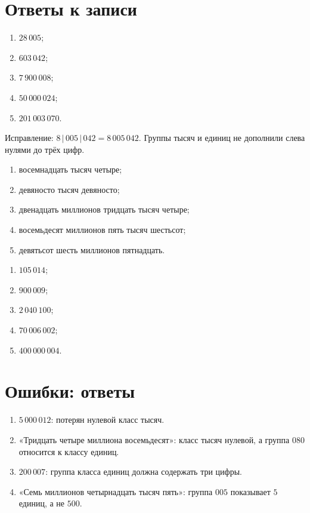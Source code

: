 \newpage
\section{Ответы к записи}

\begin{teacherbox}
  \begin{enumerate}
    \item \(28\,005\);
    \item \(603\,042\);
    \item \(7\,900\,008\);
    \item \(50\,000\,024\);
    \item \(201\,003\,070\).
  \end{enumerate}

  Исправление: \(8\,|\,005\,|\,042=8\,005\,042\). Группы тысяч и единиц не
  дополнили слева нулями до трёх цифр.
\end{teacherbox}

\begin{teacherbox}
  \begin{enumerate}
    \item восемнадцать тысяч четыре;
    \item девяносто тысяч девяносто;
    \item двенадцать миллионов тридцать тысяч четыре;
    \item восемьдесят миллионов пять тысяч шестьсот;
    \item девятьсот шесть миллионов пятнадцать.
  \end{enumerate}
\end{teacherbox}

\begin{teacherbox}
  \begin{enumerate}
    \item \(105\,014\);
    \item \(900\,009\);
    \item \(2\,040\,100\);
    \item \(70\,006\,002\);
    \item \(400\,000\,004\).
  \end{enumerate}
\end{teacherbox}

\section{Ошибки: ответы}

\begin{enumerate}
  \item \(5\,000\,012\): потерян нулевой класс тысяч.
  \item «Тридцать четыре миллиона восемьдесят»: класс тысяч нулевой, а группа
    \(080\) относится к классу единиц.
  \item \(200\,007\): группа класса единиц должна содержать три цифры.
  \item «Семь миллионов четырнадцать тысяч пять»: группа \(005\) показывает
    \(5\) единиц, а не \(500\).
\end{enumerate}

